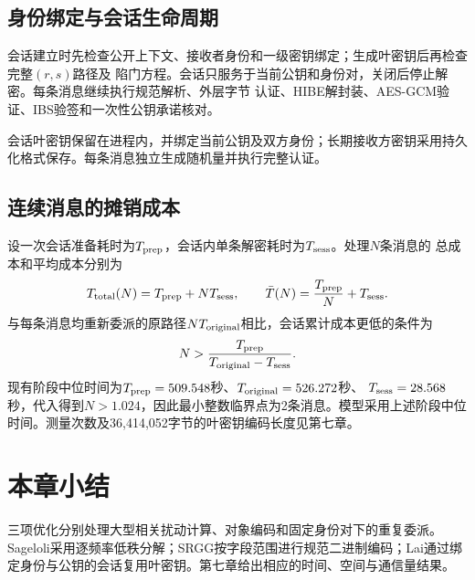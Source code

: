 \subsection{身份绑定与会话生命周期}

会话建立时先检查公开上下文、接收者身份和一级密钥绑定；生成叶密钥后再检查完整$(r,s)$路径及
陷门方程。会话只服务于当前公钥和身份对，关闭后停止解密。每条消息继续执行规范解析、外层字节
认证、HIBE解封装、AES-GCM验证、IBS验签和一次性公钥承诺核对。

会话叶密钥保留在进程内，并绑定当前公钥及双方身份；长期接收方密钥采用持久化格式保存。每条消息独立生成随机量并执行完整认证。

\subsection{连续消息的摊销成本}

设一次会话准备耗时为$T_{\rm prep}$，会话内单条解密耗时为$T_{\rm sess}$。处理$N$条消息的
总成本和平均成本分别为
\[
 T_{\rm total}(N)=T_{\rm prep}+NT_{\rm sess},\qquad
 \bar T(N)=\frac{T_{\rm prep}}{N}+T_{\rm sess}.
\]
与每条消息均重新委派的原路径$NT_{\rm original}$相比，会话累计成本更低的条件为
\[
 N>\frac{T_{\rm prep}}{T_{\rm original}-T_{\rm sess}}.
\]
现有阶段中位时间为$T_{\rm prep}=509.548$秒、$T_{\rm original}=526.272$秒、
$T_{\rm sess}=28.568$秒，代入得到$N>1.024$，因此最小整数临界点为2条消息。模型采用上述阶段中位时间。测量次数及36,414,052字节的叶密钥编码长度见第七章。

\section{本章小结}

三项优化分别处理大型相关扰动计算、对象编码和固定身份对下的重复委派。Sageloli采用逐频率低秩分解；SRGG按字段范围进行规范二进制编码；Lai通过绑定身份与公钥的会话复用叶密钥。第七章给出相应的时间、空间与通信量结果。
